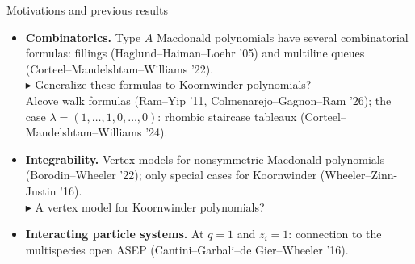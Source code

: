 \documentclass[10pt]{beamer}
\begin{document}
\begin{frame}{Motivations and previous results}
\begin{itemize}\setlength{\itemsep}{1.2em}
  \item \textbf{Combinatorics.} Type $A$ Macdonald polynomials have several combinatorial formulas: fillings (Haglund--Haiman--Loehr '05) and multiline queues (Corteel--Mandelshtam--Williams '22).\\
  $\blacktriangleright$ Generalize these formulas to Koornwinder polynomials?\\
  \pause
  Alcove walk formulas (Ram--Yip '11, Colmenarejo--Gagnon--Ram '26); the case $\lambda=(1,\dots,1,0,\dots,0)$: rhombic staircase tableaux (Corteel--Mandelshtam--Williams '24).
  \pause
  \item \textbf{Integrability.} Vertex models for nonsymmetric Macdonald polynomials (Borodin--Wheeler '22); only special cases for Koornwinder (Wheeler--Zinn-Justin '16).\\
  $\blacktriangleright$ A vertex model for Koornwinder polynomials?
  \pause
  \item \textbf{Interacting particle systems.} At $q=1$ and $z_i=1$: connection to the multispecies open ASEP (Cantini--Garbali--de Gier--Wheeler '16).
\end{itemize}
\end{frame}
\end{document}
